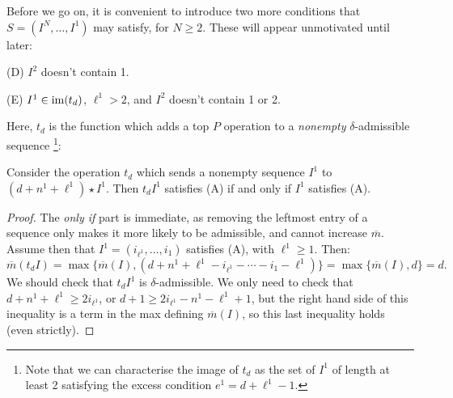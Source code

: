 \documentclass[10pt]{article}
\newcommand{\minDimP}{\overline{m}}
\begin{document}
\begin{SequenceOfSequencesIntro}
Before we go on, it is convenient to introduce two more conditions that $S=(I^N,\ldots,I^1)$ may satisfy, for $N\geq2$. These will appear unmotivated until later:
\begin{itemise}
\setlength{\parindent}{.25in}
\item[(D)] $I^2$ doesn't contain 1.
\item[(E)] $I^1\in\operatorname{im}(t_d)$, $\ell^1>2$, and $I^2$ doesn't contain 1 or 2.
\end{itemise}
Here, $t_d$ is the function which adds a top $P$ operation to a \emph{nonempty} $\delta$-admissible sequence%
\footnote{Note that we can characterise the image of $t_d$ as the set of $I^1$ of length at least 2 satisfying the excess condition $e^1=d+\ell^1-1$.}:
\begin{lem}\label{tdPreservesA}
Consider the operation $t_d$ which sends a nonempty sequence  $I^1$ to $(d+n^1+\ell^1)\star I^1$. Then $t_dI^1$ satisfies \textup{(A)} if and only if $I^1$ satisfies \textup{(A)}.
\end{lem}
\begin{proof}
The \emph{only if} part is immediate, as removing the leftmost entry of a sequence only makes it more likely to be admissible, and cannot increase $\minDimP$. Assume then that $I^1=(i_{\ell^1},\ldots,i_1)$ satisfies \textup{(A)}, with $\ell^1\geq1$. Then:%
\[\minDimP(t_dI)=\max\{\minDimP(I),(d+n^1+\ell^1-i_{\ell^1}-\cdots -i_1-\ell^1)\}=\max\{\minDimP(I),d\}=d.\]
We should check that $t_dI^1$ is $\delta$-admissible. We only need to check that $d+n^1+\ell^1\geq2i_{\ell^1}$, or $d+1\geq2i_{\ell^1}-n^1-\ell^1+1$, but the right hand side of this inequality is a term in the max defining $\minDimP(I)$, so this last inequality holds (even strictly).
\end{proof}
\end{SequenceOfSequencesIntro}
\end{document}
